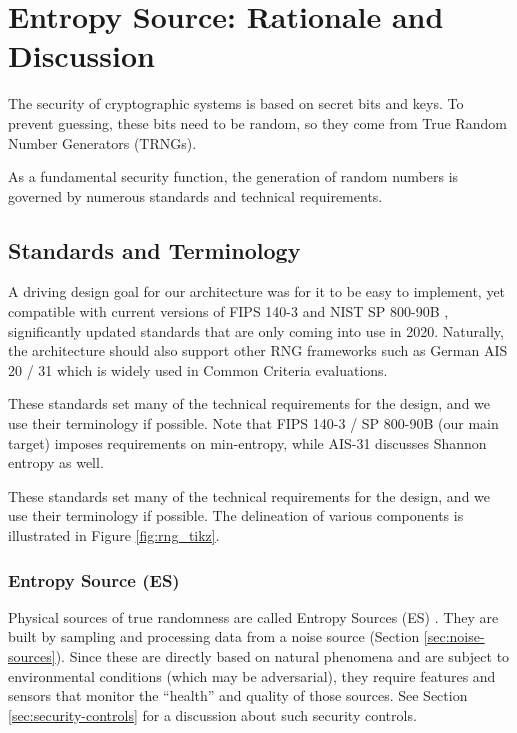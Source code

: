 
\newpage
\section{Entropy Source: Rationale and Discussion}
\label{sec:entropy-appendix}


    The security of cryptographic systems is based on secret bits and keys.
    To prevent guessing, these bits need to be random, so they come from
    True Random Number Generators (TRNGs).

    As a fundamental security function, the generation of random numbers is
    governed by numerous standards and technical requirements.

\subsection{Standards and Terminology}

    A driving design goal for our architecture was for it to be easy to
    implement, yet compatible with current versions of FIPS 140-3
    \cite{NI19} and NIST SP 800-90B \cite{TuBaKe+18}, significantly
    updated standards that are only coming into use in 2020. Naturally,
    the architecture should also support other RNG frameworks such as
    German AIS 20 / 31 \cite{KiSc01,KiSc11} which is widely used
    in Common Criteria evaluations.

    These standards set many of the technical requirements for the design,
    and we use their terminology if possible. Note that FIPS 140-3 /
    SP 800-90B (our main target) imposes requirements on min-entropy, while
    AIS-31 discusses Shannon entropy as well.

    These standards set many of the technical requirements for the design,
    and we use their terminology if possible.
    The delineation of various components is illustrated in Figure
    \ref{fig:rng_tikz}.


    \subsubsection{Entropy Source (ES)}
    \label{sec:intro-es}
    Physical sources of true randomness are called Entropy Sources (ES)
    \cite{TuBaKe+18}. They are built by sampling and processing data
    from a noise source (Section \ref{sec:noise-sources}). Since these
    are directly based on natural phenomena and are subject to
    environmental conditions (which may be adversarial), they require
    features and sensors that monitor the ``health'' and quality of those
    sources. See Section \ref{sec:security-controls} for a discussion about
    such security controls.

